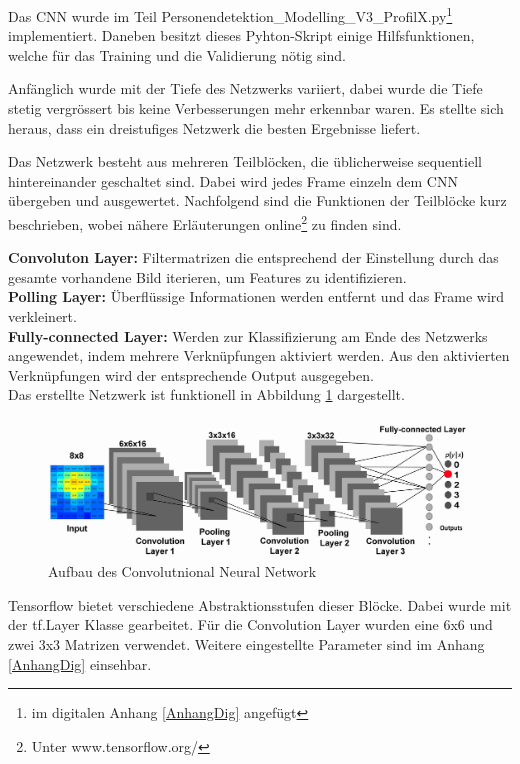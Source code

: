 Das \ac{CNN} wurde im Teil Personendetektion\_Modelling\_V3\_ProfilX.py\footnote[27]{im digitalen Anhang \ref{AnhangDig} angefügt} implementiert. Daneben besitzt dieses Pyhton-Skript einige Hilfsfunktionen, welche für das Training und die Validierung nötig sind.

Anfänglich wurde mit der Tiefe des Netzwerks variiert, dabei wurde die Tiefe stetig vergrössert bis keine Verbesserungen mehr erkennbar waren. Es stellte sich heraus, dass ein dreistufiges Netzwerk die besten Ergebnisse liefert.

Das Netzwerk besteht aus mehreren Teilblöcken, die üblicherweise sequentiell hintereinander geschaltet sind. Dabei wird jedes Frame einzeln dem \ac{CNN} übergeben und ausgewertet. Nachfolgend sind die Funktionen der Teilblöcke kurz beschrieben, wobei nähere Erläuterungen online\footnote[28]{Unter www.tensorflow.org/ } zu finden sind.

\textbf{Convoluton Layer:} Filtermatrizen die entsprechend der Einstellung durch das gesamte vorhandene Bild iterieren, um Features zu identifizieren.   \\
\textbf{Polling Layer:} Überflüssige Informationen werden entfernt und das Frame wird verkleinert.   \\
\textbf{Fully-connected Layer:} Werden zur Klassifizierung am Ende des Netzwerks angewendet, indem mehrere Verknüpfungen aktiviert werden. Aus den aktivierten Verknüpfungen wird der entsprechende Output ausgegeben.   \\

Das erstellte Netzwerk ist funktionell in Abbildung \ref{fig:CNN} dargestellt.
\begin{figure}[H]
	\centering
	\includegraphics[width=1\textwidth]
	{fig/CNN_broschuere.jpg}
	\caption[Aufbau des Convolutional Neural Network]{Aufbau des Convolutnional Neural Network}
	\label{fig:CNN}
\end{figure}

Tensorflow bietet verschiedene Abstraktionsstufen dieser Blöcke. Dabei wurde mit der tf.Layer Klasse gearbeitet.
Für die Convolution Layer wurden eine 6x6 und zwei 3x3 Matrizen verwendet. Weitere eingestellte Parameter sind im  Anhang \ref{AnhangDig} einsehbar.

